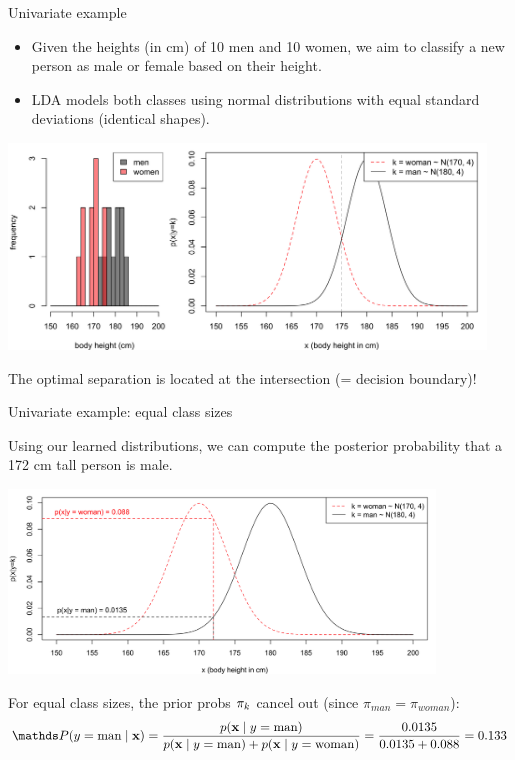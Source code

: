 \documentclass[11pt,compress,t,notes=noshow, xcolor=table]{beamer}
\begin{document}
\begin{vbframe}{Univariate example}
\begin{small}
\begin{itemize}
\item Given the heights (in cm) of 10 men and 10 women, we aim to classify a new person as male or female based on their height.
\item LDA models both classes using normal distributions with equal standard deviations (identical shapes).
\end{itemize}
\begin{center}
\includegraphics[width=0.95\textwidth, clip=true, trim={0 0 0 0}]{figure/disc_univariate-1.png}
\end{center}
\centerline{The optimal separation is located at the intersection (= decision boundary)!}
\end{small}
\end{vbframe}

\begin{vbframe}{Univariate example: equal class sizes}
\begin{small}
Using our learned distributions, we can compute the posterior probability that a 172 cm tall person is male.
\begin{center}
\includegraphics[width=0.85\textwidth, clip=true, trim={0 0 0 0}]{figure/disc_univariate-2.png}
\end{center}
For equal class sizes, the prior probs $\pi_{k}$ cancel out (since $\pi_{man} = \pi_{woman}$):
$$
\P(y = \text{man} \mid \xv) = \frac{p(\xv \mid y = \text{man})}{p(\xv \mid y = \text{man}) + p(\xv \mid y = \text{woman})} = \frac{0.0135}{0.0135 + 0.088} = 0.133
$$
\end{small}
\end{vbframe}
\end{document}
